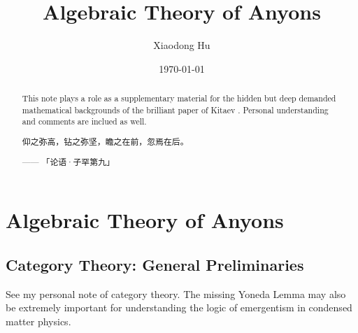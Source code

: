 \documentclass[10pt,nofootinbib]{revtex4}
\newcounter{Lemma}[section]
\begin{document}
\title{Algebraic Theory of Anyons}
\author{Xiaodong Hu}

\date{\today}

\begin{abstract}
	This note plays a role as a supplementary material for the hidden but deep demanded mathematical backgrounds of the brilliant paper of Kitaev \cite{kitaev2006anyons}. Personal understanding and comments are inclued as well.\par
		\hfill\par
		{\centering\kaishu 仰之弥高，钻之弥坚，瞻之在前，忽焉在后。\par}
	\hfill------ 「论语·子罕第九」
\end{abstract}

\maketitle
\tableofcontents

\section{Algebraic Theory of Anyons}
	\subsection{Category Theory: General Preliminaries}
		See my personal note of category theory. The missing Yoneda Lemma may also be extremely important for understanding the logic of emergentism in condensed matter physics.
\end{document}

